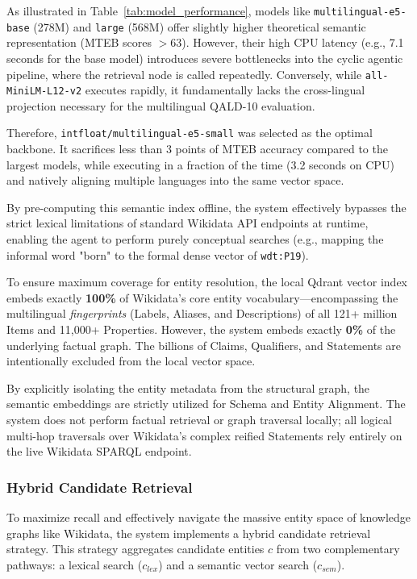 As illustrated in Table~\ref{tab:model_performance}, models like \texttt{multilingual-e5-base} (278M) and \texttt{large} (568M) offer slightly higher theoretical semantic representation (MTEB scores $>63$). However, their high CPU latency (e.g., 7.1 seconds for the base model) introduces severe bottlenecks into the cyclic agentic pipeline, where the retrieval node is called repeatedly. Conversely, while \texttt{all-MiniLM-L12-v2} executes rapidly, it fundamentally lacks the cross-lingual projection necessary for the multilingual QALD-10 evaluation.

Therefore, \texttt{intfloat/multilingual-e5-small} was selected as the optimal backbone. It sacrifices less than 3 points of MTEB accuracy compared to the largest models, while executing in a fraction of the time (3.2 seconds on CPU) and natively aligning multiple languages into the same vector space.

By pre-computing this semantic index offline, the system effectively bypasses the strict lexical limitations of standard Wikidata API endpoints at runtime, enabling the agent to perform purely conceptual searches (e.g., mapping the informal word "born" to the formal dense vector of \texttt{wdt:P19}).

 To ensure maximum coverage for entity resolution, the local Qdrant vector index embeds exactly \textbf{100\%} of Wikidata's core entity vocabulary—encompassing the multilingual \textit{fingerprints} (Labels, Aliases, and Descriptions) of all 121+ million Items and 11,000+ Properties. However, the system embeds exactly \textbf{0\%} of the underlying factual graph. The billions of Claims, Qualifiers, and Statements are intentionally excluded from the local vector space. 

By explicitly isolating the entity metadata from the structural graph, the semantic embeddings are strictly utilized for Schema and Entity Alignment. The system does not perform factual retrieval or graph traversal locally; all logical multi-hop traversals over Wikidata's complex reified Statements rely entirely on the live Wikidata SPARQL endpoint.

\subsubsection{Hybrid Candidate Retrieval}
\label{sec:hybrid_retrieval}
To maximize recall and effectively navigate the massive entity space of knowledge graphs like Wikidata, the system implements a hybrid candidate retrieval strategy. This strategy aggregates candidate entities $c$ from two complementary pathways: a lexical search ($c_{lex}$) and a semantic vector search ($c_{sem}$).

